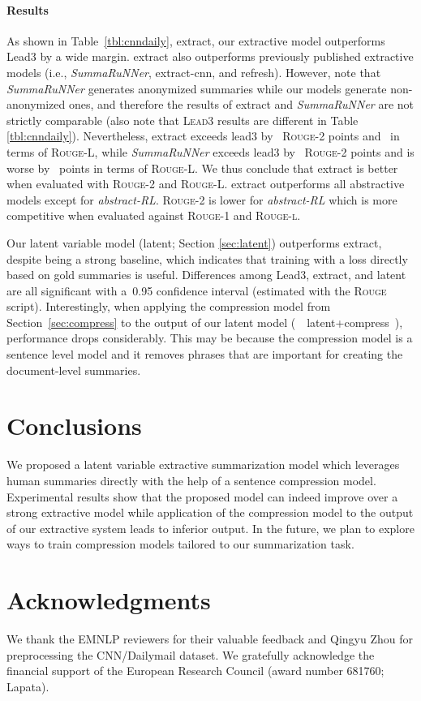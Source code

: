 \documentclass[11pt,a4paper]{article}
\begin{document}
\paragraph{Results}
As shown in Table~\ref{tbl:cnndaily}, {\sc extract}, our extractive
model outperforms {\sc Lead3} by a wide margin. {\sc extract} also
outperforms previously published extractive models (i.e., {\it
  SummaRuNNer}, {\sc extract-cnn}, and {\sc refresh}). However, note
that {\it SummaRuNNer} generates anonymized summaries
\cite{nallapati:2017:aaai} while our models generate non-anonymized
ones, and therefore the results of {\sc extract} and {\it SummaRuNNer}
are not strictly comparable (also note that \textsc{Lead3} results are
different in Table \ref{tbl:cnndaily}). Nevertheless, {\sc extract}
exceeds {\sc lead3} by~ \mbox{\textsc{Rouge-2}} points
and~ in terms of \textsc{Rouge-L}, while {\it SummaRuNNer}
exceeds {\sc lead3} by~ \textsc{Rouge}-2 points and is worse
by~ points in terms of \textsc{Rouge-L}. We thus conclude that
{\sc extract} is better when evaluated with \textsc{Rouge-2} and
\textsc{Rouge-L}. {\sc extract} outperforms all abstractive models
except for {\it abstract-RL}. \textsc{Rouge}-2 is lower for {\it
  abstract-RL} which is more competitive when evaluated against
\textsc{Rouge-1} and \textsc{Rouge-l}.


Our latent variable model ({\sc latent}; Section \ref{sec:latent})
outperforms {\sc extract}, despite being a strong baseline, which
indicates that training with a loss directly based on gold summaries
is useful. Differences among {\sc Lead3}, {\sc extract}, and {\sc
  latent} are all significant with a~0.95 confidence interval
(estimated with the \textsc{Rouge} script).
Interestingly, when applying the compression model from
Section~\ref{sec:compress} to the output of our latent model (\mbox{ {\sc
  latent+compress} }), performance drops considerably. This may be
because the compression model is a sentence level model and it removes
phrases that are important for creating the document-level summaries.



\section{Conclusions}
We proposed a latent variable extractive summarization model which
leverages human summaries directly with the help of a sentence
compression model.  Experimental results show that the proposed model
can indeed improve over a strong extractive model while application of
the compression model to the output of our extractive system leads to
inferior output. In the future, we plan to explore ways to train
compression models tailored to our summarization task.

\section*{Acknowledgments}
We thank the EMNLP reviewers for their valuable feedback and Qingyu
Zhou for preprocessing the CNN/Dailymail dataset. We gratefully
acknowledge the financial support of the European Research Council
(award number 681760; Lapata).



\end{document}
